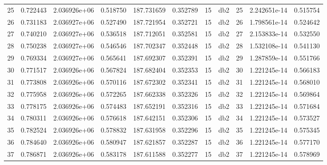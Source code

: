 \begin{tabular}{lrrrrrrlrrr}
25   &    0.722443 &        2.036926e+06 &  0.518750 &              187.731659 &    0.352789 &      15 &          db2 &     25 &   2.242651e-14 &      0.515754 \\
26   &    0.731183 &        2.036927e+06 &  0.527490 &              187.721954 &    0.352721 &      15 &          db2 &     26 &   1.798561e-14 &      0.524642 \\
27   &    0.740210 &        2.036927e+06 &  0.536518 &              187.712051 &    0.352581 &      15 &          db2 &     27 &   2.153833e-14 &      0.532550 \\
28   &    0.750238 &        2.036927e+06 &  0.546546 &              187.702347 &    0.352448 &      15 &          db2 &     28 &   1.532108e-14 &      0.541130 \\
29   &    0.769334 &        2.036927e+06 &  0.565641 &              187.692307 &    0.352391 &      15 &          db2 &     29 &   1.287859e-14 &      0.551766 \\
30   &    0.771517 &        2.036926e+06 &  0.567824 &              187.682404 &    0.352353 &      15 &          db2 &     30 &   1.221245e-14 &      0.566183 \\
31   &    0.773808 &        2.036926e+06 &  0.570116 &              187.672302 &    0.352341 &      15 &          db2 &     31 &   1.221245e-14 &      0.568010 \\
32   &    0.775958 &        2.036926e+06 &  0.572265 &              187.662338 &    0.352326 &      15 &          db2 &     32 &   1.221245e-14 &      0.569864 \\
33   &    0.778175 &        2.036926e+06 &  0.574483 &              187.652191 &    0.352316 &      15 &          db2 &     33 &   1.221245e-14 &      0.571684 \\
34   &    0.780311 &        2.036926e+06 &  0.576618 &              187.642151 &    0.352306 &      15 &          db2 &     34 &   1.221245e-14 &      0.573527 \\
35   &    0.782524 &        2.036926e+06 &  0.578832 &              187.631958 &    0.352296 &      15 &          db2 &     35 &   1.221245e-14 &      0.575345 \\
36   &    0.784640 &        2.036926e+06 &  0.580947 &              187.621857 &    0.352287 &      15 &          db2 &     36 &   1.221245e-14 &      0.577170 \\
37   &    0.786871 &        2.036926e+06 &  0.583178 &              187.611588 &    0.352277 &      15 &          db2 &     37 &   1.221245e-14 &      0.578969 \\

\end{tabular}
